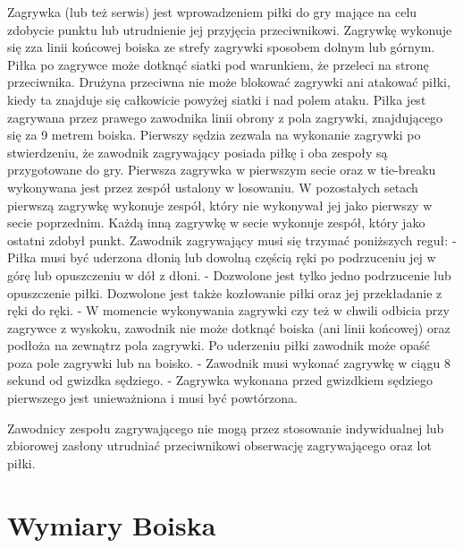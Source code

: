 \documentclass[14pt,oneside,a4paper]{book}
\theoremstyle{break}
\begin{document}
Zagrywka (lub też serwis) jest wprowadzeniem piłki do gry mające na celu zdobycie punktu lub utrudnienie jej przyjęcia przeciwnikowi. Zagrywkę wykonuje się zza linii końcowej boiska ze strefy zagrywki sposobem dolnym lub górnym. Piłka po zagrywce może dotknąć siatki pod warunkiem, że przeleci na stronę przeciwnika. Drużyna przeciwna nie może blokować zagrywki ani atakować piłki, kiedy ta znajduje się całkowicie powyżej siatki i nad polem ataku.
Piłka jest zagrywana przez prawego zawodnika linii obrony z pola zagrywki, znajdującego się za 9 metrem boiska. Pierwszy sędzia zezwala na wykonanie zagrywki po stwierdzeniu, że zawodnik zagrywający posiada piłkę i oba zespoły są przygotowane do gry.
Pierwsza zagrywka w pierwszym secie oraz w tie-breaku wykonywana jest przez zespół ustalony w losowaniu. W pozostałych setach pierwszą zagrywkę wykonuje zespół, który nie wykonywał jej jako pierwszy w secie poprzednim. Każdą inną zagrywkę w secie wykonuje zespół, który jako ostatni zdobył punkt.
Zawodnik zagrywający musi się trzymać poniższych reguł:
- Piłka musi być uderzona dłonią lub dowolną częścią ręki po podrzuceniu jej w górę lub opuszczeniu w dół z dłoni.
- Dozwolone jest tylko jedno podrzucenie lub opuszczenie piłki. Dozwolone jest także kozłowanie piłki oraz jej przekładanie z ręki do ręki.
- W momencie wykonywania zagrywki czy też w chwili odbicia przy zagrywce z wyskoku, zawodnik nie może dotknąć boiska (ani linii końcowej) oraz podłoża na zewnątrz pola zagrywki. Po uderzeniu piłki zawodnik może opaść poza pole zagrywki lub na boisko.
- Zawodnik musi wykonać zagrywkę w ciągu 8 sekund od gwizdka sędziego.
- Zagrywka wykonana przed gwizdkiem sędziego pierwszego jest unieważniona i musi być powtórzona.

Zawodnicy zespołu zagrywającego nie mogą przez stosowanie indywidualnej lub zbiorowej zasłony utrudniać przeciwnikowi obserwację zagrywającego oraz lot piłki.

\section {Wymiary Boiska}
\end{document}
